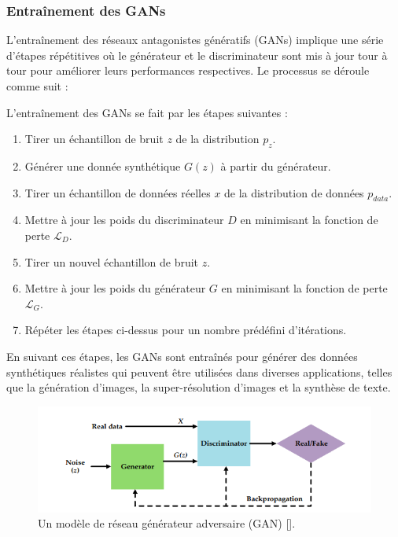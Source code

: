 \subsubsection{Entraînement des GANs}

L’entraînement des réseaux antagonistes génératifs (GANs) implique une série
d'étapes répétitives où le générateur et le discriminateur sont mis à jour tour
à tour pour améliorer leurs performances respectives. Le processus se déroule
comme suit :

L'entraînement des GANs se fait par les étapes suivantes :
\begin{enumerate}
	\item Tirer un échantillon de bruit \( z \) de la distribution \( p_z \).
	\item Générer une donnée synthétique \( G(z) \) à partir du générateur.
	\item Tirer un échantillon de données réelles \( x \) de la distribution de données
	      \( p_{data} \).
	\item Mettre à jour les poids du discriminateur \( D \) en minimisant la fonction de
	      perte \( \mathcal{L}_D \).
	\item Tirer un nouvel échantillon de bruit \( z \).
	\item Mettre à jour les poids du générateur \( G \) en minimisant la fonction de
	      perte \( \mathcal{L}_G \).
	\item Répéter les étapes ci-dessus pour un nombre prédéfini d'itérations.
\end{enumerate}

En suivant ces étapes, les GANs sont entraînés pour générer des données
synthétiques réalistes qui peuvent être utilisées dans diverses applications,
telles que la génération d'images, la super-résolution d'images et la synthèse
de texte.

\begin{figure}[hbt!]
	\centering
	\includegraphics[width=12cm]{images_pfe/gan_1.png}
	\caption{Un modèle de réseau générateur adversaire (GAN) [\cite{feng_feng_chen_cao_zhang_jiao_yu_2020}].}
	\label{fig:gan}
\end{figure}
\FloatBarrier

